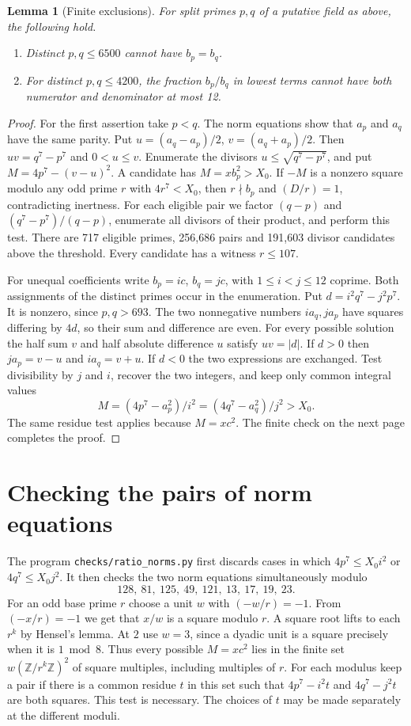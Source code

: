 \documentclass[11pt]{article}
\newtheorem{lemma}{Lemma}
\newcommand{\Z}{\mathbb Z}
\newcommand{\base}{X_0}
\begin{document}
\begin{lemma}[Finite exclusions]\label{finite}
For split primes $p,q$ of a putative field as above, the following hold.
\begin{enumerate}
\item Distinct $p,q\le6500$ cannot have $b_p=b_q$.
\item For distinct $p,q\le4200$, the fraction $b_p/b_q$ in lowest terms
cannot have both numerator and denominator at most 12.
\end{enumerate}
\end{lemma}
\begin{proof}
For the first assertion take $p<q$. The norm equations show that $a_p$
and $a_q$ have the same parity. Put
$u=(a_q-a_p)/2$, $v=(a_q+a_p)/2$. Then $uv=q^7-p^7$ and $0<u\le v$.
Enumerate the divisors $u\le\sqrt{q^7-p^7}$, and put
$M=4p^7-(v-u)^2$. A candidate has $M=xb_p^2>\base$.
If $-M$ is a nonzero square modulo any odd prime $r$ with
$4r^7<\base$, then $r\nmid b_p$ and $(D/r)=1$, contradicting inertness.
For each eligible pair we factor $(q-p)$ and $(q^7-p^7)/(q-p)$, enumerate
all divisors of their product, and perform this test. There are 717 eligible
primes, 256,686 pairs and 191,603 divisor candidates above the threshold.
Every candidate has a witness $r\le107$.

For unequal coefficients write $b_p=ic$, $b_q=jc$, with
$1\le i<j\le12$ coprime. Both assignments of the distinct primes occur in
the enumeration. Put $d=i^2q^7-j^2p^7$. It is nonzero, since $p,q>693$.
The two nonnegative numbers $i a_q,j a_p$ have squares differing by $4d$,
so their sum and difference are even. For every possible solution the half
sum $v$ and half absolute difference $u$ satisfy $uv=|d|$.
If $d>0$ then $j a_p=v-u$ and $i a_q=v+u$. If $d<0$ the two expressions
are exchanged. Test divisibility by $j$ and $i$, recover the two integers,
and keep only common integral values
\[
        M=(4p^7-a_p^2)/i^2=(4q^7-a_q^2)/j^2>\base .
\]
The same residue test applies because $M=xc^2$. The finite check on the
next page completes the proof.
\end{proof}

\newpage
\section{Checking the pairs of norm equations}
The program \texttt{checks/ratio\_norms.py} first discards cases in which
$4p^7\le\base i^2$ or $4q^7\le\base j^2$. It then checks the two norm
equations simultaneously modulo
\[
             128,\ 81,\ 125,\ 49,\ 121,\ 13,\ 17,\ 19,\ 23 .
\]
For an odd base prime $r$ choose a unit $w$ with $(-w/r)=-1$.
From $(-x/r)=-1$ we get that $x/w$ is a square modulo $r$. A square root lifts to
each $r^k$ by Hensel's lemma. At $2$ use $w=3$, since a dyadic unit
is a square precisely when it is $1\bmod 8$.
Thus every possible $M=xc^2$ lies in the finite set $w(\Z/r^k\Z)^2$
of square multiples, including multiples of $r$. For each modulus keep
a pair if there is a common residue $t$ in this set such that
$4p^7-i^2t$ and $4q^7-j^2t$ are both squares. This test is necessary.
The choices of $t$ may be made separately at the different moduli.
\end{document}
